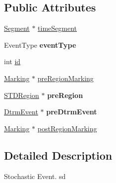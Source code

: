 \subsection*{Public Attributes}
\begin{DoxyCompactItemize}
\item 
\hyperlink{classSegment}{Segment} $\ast$ \hyperlink{structStochasticEvent_a39fc3833721f4066c15044e6772a5435}{time\-Segment}
\item 
\hypertarget{structStochasticEvent_a690adfab90bc2fe8652acfa56ac97f5c}{Event\-Type {\bfseries event\-Type}}\label{structStochasticEvent_a690adfab90bc2fe8652acfa56ac97f5c}

\item 
int \hyperlink{structStochasticEvent_a359f6c7f5e9d624744e35fb187adcc73}{id}
\item 
\hyperlink{structMarking}{Marking} $\ast$ \hyperlink{structStochasticEvent_a3179b1980d441007158d7a9c77b8ca1d}{pre\-Region\-Marking}
\item 
\hypertarget{structStochasticEvent_a643f0efa415d0d4a9bf435c9b78fa8df}{\hyperlink{classSTDRegion}{S\-T\-D\-Region} $\ast$ {\bfseries pre\-Region}}\label{structStochasticEvent_a643f0efa415d0d4a9bf435c9b78fa8df}

\item 
\hypertarget{structStochasticEvent_a34eef0f58d7388aae730fc042311826c}{\hyperlink{structDtrmEvent}{Dtrm\-Event} $\ast$ {\bfseries pre\-Dtrm\-Event}}\label{structStochasticEvent_a34eef0f58d7388aae730fc042311826c}

\item 
\hyperlink{structMarking}{Marking} $\ast$ \hyperlink{structStochasticEvent_a9c694991cdb06b9499b9c4295af4d98b}{post\-Region\-Marking}
\end{DoxyCompactItemize}


\subsection{Detailed Description}
Stochastic Event. sd 

